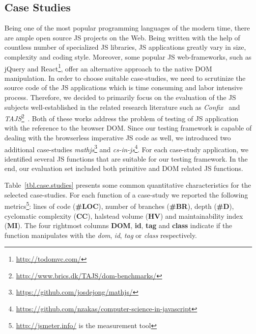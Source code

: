 \documentclass[sigconf]{acmart}
\begin{document}
\subsection{Case Studies}
\label{sub.sec.case.studies}

Being one of the most popular programming languages of the modern time, there are ample open source JS projects on the Web. Being written with the help of countless number of specialized JS libraries, JS applications greatly vary in size, complexity and coding style. Moreover, some popular JS web-frameworks, such as jQuery and React\footnote{\url{http://todomvc.com/}}, offer an alternative approach to the native DOM manipulation. In order to choose suitable case-studies, we need to scrutinize the source code of the JS applications which is time consuming and labor intensive process. Therefore, we decided to primarily focus on the evaluation of the JS subjects well-established in the related research literature such as \emph{Confix}~\cite{amin:ase15} and \emph{TAJS}\footnote{\url{http://www.brics.dk/TAJS/dom-benchmarks/}}~\cite{dom2011}. Both of these works address the problem of testing of JS application with the reference to the browser DOM. Since our testing framework is capable of dealing with the browserless imperative JS code as well, we introduced two additional case-studies \emph{mathjs}\footnote{\url{https://github.com/josdejong/mathjs/}} and \emph{cs-in-js}\footnote{\url{https://github.com/nzakas/computer-science-in-javascript}}. For each case-study application, we identified several JS functions that are suitable for our testing framework. In the end, our evaluation set included both primitive and DOM related JS functions.

Table~\ref{tbl.case.studies} presents some common quantitative characteristics for the selected case-studies. For each function of a case-study we reported the following metrics\footnote{\url{http://jsmeter.info/} is the measurement tool}: lines of code (\textbf{\#LOC}), number of branches (\textbf{\#BR}), depth (\textbf{\#D}), cyclomatic complexity (\textbf{CC}), halstead volume (\textbf{HV}) and maintainability index (\textbf{MI}). The four rightmost columns \textbf{DOM}, \textbf{id}, \textbf{tag} and \textbf{class} indicate if the function manipulates with the \emph{dom}, \emph{id}, \emph{tag} or \emph{class} respectively.      
\end{document}
